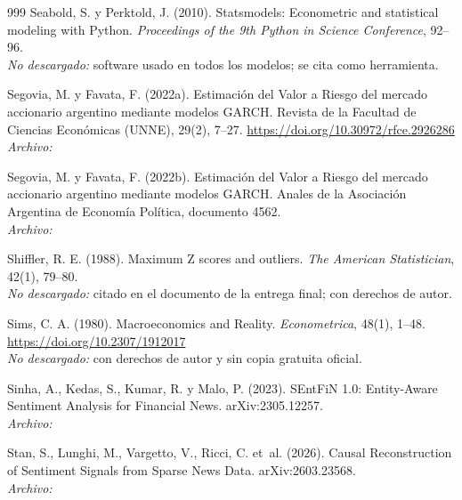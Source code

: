 \begin{thebibliography}{999}
Seabold, S. y Perktold, J. (2010). Statsmodels: Econometric and statistical modeling with Python. \emph{Proceedings of the 9th Python in Science Conference}, 92--96.
\\\textit{No descargado:} software usado en todos los modelos; se cita como herramienta.

Segovia, M. y Favata, F. (2022a). Estimación del Valor a Riesgo del mercado accionario argentino mediante modelos GARCH. Revista de la Facultad de Ciencias Económicas (UNNE), 29(2), 7–27. \url{https://doi.org/10.30972/rfce.2926286}
\\\textit{Archivo:} 

Segovia, M. y Favata, F. (2022b). Estimación del Valor a Riesgo del mercado accionario argentino mediante modelos GARCH. Anales de la Asociación Argentina de Economía Política, documento 4562.
\\\textit{Archivo:} 

Shiffler, R. E. (1988). Maximum Z scores and outliers. \emph{The American Statistician}, 42(1), 79--80.
\\\textit{No descargado:} citado en el documento de la entrega final; con derechos de autor.

Sims, C. A. (1980). Macroeconomics and Reality. \emph{Econometrica}, 48(1), 1--48. \url{https://doi.org/10.2307/1912017}
\\\textit{No descargado:} con derechos de autor y sin copia gratuita oficial.

Sinha, A., Kedas, S., Kumar, R. y Malo, P. (2023). {SEntFiN} 1.0: Entity-Aware Sentiment Analysis for Financial News. arXiv:2305.12257.
\\\textit{Archivo:} 

Stan, S., Lunghi, M., Vargetto, V., Ricci, C. et~al. (2026). Causal Reconstruction of Sentiment Signals from Sparse News Data. arXiv:2603.23568.
\\\textit{Archivo:} 


\end{thebibliography}
